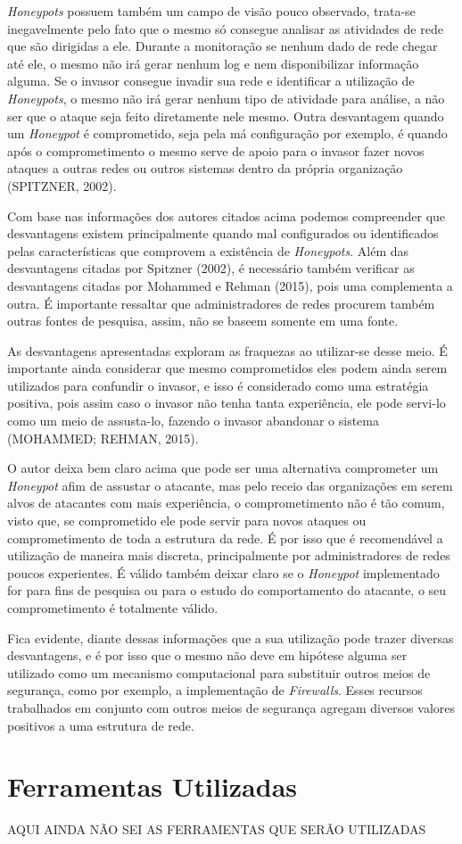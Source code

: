 \textit{Honeypots} possuem também um campo de visão pouco observado, trata-se inegavelmente pelo fato que o mesmo só consegue analisar as atividades de rede que são dirigidas a ele. Durante a monitoração se nenhum dado de rede chegar até ele, o mesmo não irá gerar nenhum log e nem disponibilizar informação alguma. Se o invasor consegue invadir sua rede e identificar a utilização de \textit{Honeypots}, o mesmo não irá gerar nenhum tipo de atividade para análise, a não ser que o ataque seja feito diretamente nele mesmo. Outra desvantagem quando um \textit{Honeypot} é comprometido, seja pela má configuração por exemplo, é quando após o comprometimento o mesmo serve de apoio para o invasor fazer novos ataques a outras redes ou outros sistemas dentro da própria organização (SPITZNER, 2002).

Com base nas informações dos autores citados acima podemos compreender que desvantagens existem principalmente quando mal configurados ou identificados pelas características que comprovem a existência de \textit{Honeypots}. Além das desvantagens citadas por Spitzner (2002), é necessário também verificar as desvantagens citadas por Mohammed e Rehman (2015), pois uma complementa a outra. É importante ressaltar que administradores de redes procurem também outras fontes de pesquisa, assim, não se baseem somente em uma fonte.

As desvantagens apresentadas exploram as fraquezas ao utilizar-se desse meio. É importante ainda considerar que mesmo comprometidos eles podem ainda serem utilizados para confundir o invasor, e isso é considerado como uma estratégia positiva, pois assim caso o invasor não tenha tanta experiência, ele pode servi-lo como um meio de assusta-lo, fazendo o invasor abandonar o sistema (MOHAMMED; REHMAN, 2015).

O autor deixa bem claro acima que pode ser uma alternativa comprometer um \textit{Honeypot} afim de assustar o atacante, mas pelo receio das organizações em serem alvos de atacantes com mais experiência, o comprometimento não é tão comum, visto que, se comprometido ele pode servir para novos ataques ou comprometimento de toda a estrutura da rede. É por isso que é recomendável a utilização de maneira mais discreta, principalmente por administradores de redes poucos experientes. É válido também deixar claro se o \textit{Honeypot} implementado for para fins de pesquisa ou para o estudo do comportamento do atacante, o seu comprometimento é totalmente válido.

Fica evidente, diante dessas informações que a sua utilização pode trazer diversas desvantagens, e é por isso que o mesmo não deve em hipótese alguma ser utilizado como um mecanismo computacional para substituir outros meios de segurança, como por exemplo, a implementação de \textit{Firewalls}. Esses recursos trabalhados em conjunto com outros meios de segurança agregam diversos valores positivos a uma estrutura de rede.

\section{Ferramentas Utilizadas}
AQUI AINDA NÃO SEI AS FERRAMENTAS QUE SERÃO UTILIZADAS
